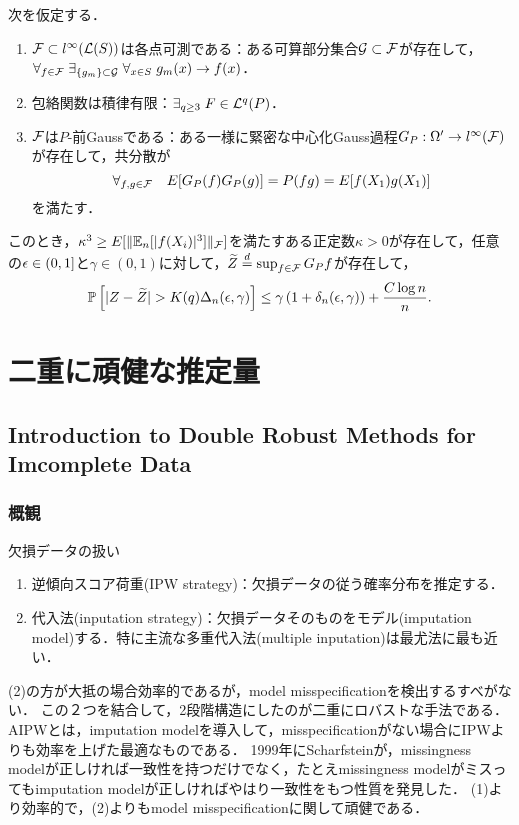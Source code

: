 \documentclass[uplatex,dvipdfmx]{jsreport}
\begin{document}
\begin{theorem}
    次を仮定する．
    \begin{enumerate}[({A}1)]
        \item $\mathcal{F}\subset l^\infty(\mathcal{L}(S))$は各点可測である：ある可算部分集合$\mathcal{G}\subset\mathcal{F}$が存在して，$\forall_{f\in\mathcal{F}}\;\exists_{\{g_m\}\subset\mathcal{G}}\;\forall_{x\in S}\;g_m(x)\to f(x)$．
        \item 包絡関数は積律有限：$\exists_{q\ge 3}\;F\in\mathcal{L}^q(P)$．
        \item $\mathcal{F}$は$P$-前Gaussである：ある一様に緊密な中心化Gauss過程$G_P:\Omega'\to l^\infty(\mathcal{F})$が存在して，共分散が
        \[\forall_{f,g\in\mathcal{F}}\quad E[G_P(f)G_P(g)]=P(fg)=E[f(X_1)g(X_1)]\]
        を満たす．
    \end{enumerate}
    このとき，$\kappa^3\ge E[\|\mathbb{E}_n[\lvert f(X_i)\rvert^3]\|_{\mathcal{F}}]$を満たすある正定数$\kappa>0$が存在して，任意の$\epsilon\in(0,1]$と$\gamma\in(0,1)$に対して，$\widetilde{Z}\overset{d}{=}\sup_{f\in\mathcal{F}}G_Pf$が存在して，
    \[\mathbb{P}\left[\lvert Z-\widetilde{Z}\rvert>K(q)\Delta_n(\epsilon,\gamma)\right]\le\gamma\left(1+\delta_n(\epsilon,\gamma)\right)+\frac{C\log n}{n}.\]
\end{theorem}

\chapter{二重に頑健な推定量}

\section{Introduction to Double Robust Methods for Imcomplete Data}

\subsection{概観}

欠損データの扱い
\begin{enumerate}
    \item 逆傾向スコア荷重(IPW strategy)：欠損データの従う確率分布を推定する．
    \item 代入法(inputation strategy)：欠損データそのものをモデル(imputation model)する．特に主流な多重代入法(multiple inputation)は最尤法に最も近い．
\end{enumerate}
(2)の方が大抵の場合効率的であるが，model misspecificationを検出するすべがない．
この２つを結合して，2段階構造にしたのが二重にロバストな手法である．
AIPWとは，imputation modelを導入して，misspecificationがない場合にIPWよりも効率を上げた最適なものである．
1999年にScharfsteinが，missingness modelが正しければ一致性を持つだけでなく，たとえmissingness modelがミスってもimputation modelが正しければやはり一致性をもつ性質を発見した．
(1)より効率的で，(2)よりもmodel misspecificationに関して頑健である．
\end{document}
